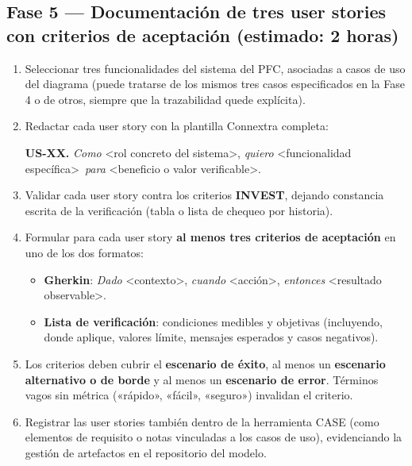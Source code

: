 \documentclass[11pt]{article}
\begin{document}
\subsection*{\textcolor{midblue}{Fase 5 --- Documentación de tres user stories con criterios de aceptación (estimado: 2 horas)}}
\begin{enumerate}[leftmargin=18pt,itemsep=2pt]
  \item Seleccionar tres funcionalidades del sistema del PFC, asociadas a casos de uso del diagrama (puede tratarse de los mismos tres casos especificados en la Fase 4 o de otros, siempre que la trazabilidad quede explícita).
  \item Redactar cada user story con la plantilla Connextra completa:
  \begin{tcolorbox}[colback=lightblue,colframe=midblue,boxrule=0.6pt,arc=2mm]
    \textbf{US-XX.} \textit{Como} \textless rol concreto del sistema\textgreater, \textit{quiero} \textless funcionalidad específica\textgreater\ \textit{para} \textless beneficio o valor verificable\textgreater.
  \end{tcolorbox}
  \item Validar cada user story contra los criterios \textbf{INVEST}, dejando constancia escrita de la verificación (tabla o lista de chequeo por historia).
  \item Formular para cada user story \textbf{al menos tres criterios de aceptación} en uno de los dos formatos:
    \begin{itemize}[leftmargin=14pt,itemsep=1pt]
      \item \textbf{Gherkin}: \textit{Dado} \textless contexto\textgreater, \textit{cuando} \textless acción\textgreater, \textit{entonces} \textless resultado observable\textgreater.
      \item \textbf{Lista de verificación}: condiciones medibles y objetivas (incluyendo, donde aplique, valores límite, mensajes esperados y casos negativos).
    \end{itemize}
  \item Los criterios deben cubrir el \textbf{escenario de éxito}, al menos un \textbf{escenario alternativo o de borde} y al menos un \textbf{escenario de error}. Términos vagos sin métrica («rápido», «fácil», «seguro») invalidan el criterio.
  \item Registrar las user stories también dentro de la herramienta CASE (como elementos de requisito o notas vinculadas a los casos de uso), evidenciando la gestión de artefactos en el repositorio del modelo.
\end{enumerate}
\end{document}
